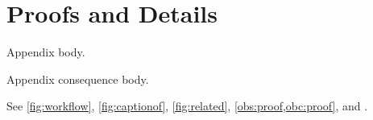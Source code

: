 \section[Proof Notes]{Proofs and Details}\label{sec:proof}
\begin{oblemma}\label{obs:proof}
Appendix body.
\end{oblemma}
\begin{obcor}\label{obc:proof}
Appendix consequence body.
\end{obcor}
See \autoref{fig:workflow}, \autoref{fig:captionof}, \autoref{fig:related}, \cref{obs:proof,obc:proof}, and .
